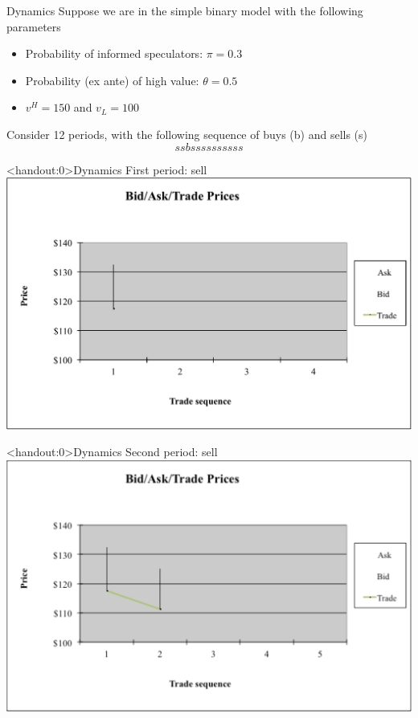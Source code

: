 \documentclass[english,10pt]{beamer}
\begin{document}
\begin{frame}[label=dynamics]{Dynamics}
	Suppose we are in the simple binary model with the following parameters
	\begin{itemize}
		\item Probability of informed speculators: $\pi = 0.3$
		\item Probability (ex ante) of high value: $\theta = 0.5$
		\item $v^H=150$ and $v_L=100$
	\end{itemize}
	Consider 12 periods, with the following sequence of buys (b) and sells (s)
	\[
	ssbssssssssss
	\]
\end{frame}


\begin{frame}<handout:0>{Dynamics}
	First period: sell
	\center
	\includegraphics[width=0.9\linewidth]{pics/P1_Image.pdf}
\end{frame}


\begin{frame}<handout:0>{Dynamics}
	Second period: sell
	\center
	\includegraphics[width=0.9\linewidth]{pics/P2_Image.pdf}
\end{frame}
\end{document}
